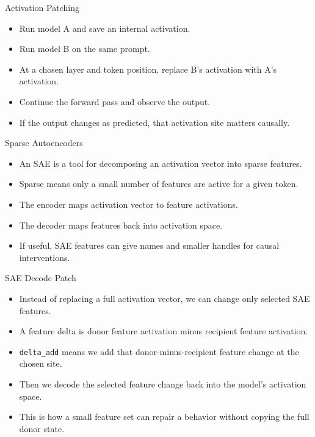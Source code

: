 \documentclass[aspectratio=169]{beamer}
\begin{document}
\begin{frame}{Activation Patching}
\small
\begin{itemize}
  \item Run model A and save an internal activation.
  \item Run model B on the same prompt.
  \item At a chosen layer and token position, replace B's activation with A's activation.
  \item Continue the forward pass and observe the output.
  \item If the output changes as predicted, that activation site matters causally.
\end{itemize}
\end{frame}

\begin{frame}{Sparse Autoencoders}
\small
\begin{itemize}
  \item An SAE is a tool for decomposing an activation vector into sparse features.
  \item Sparse means only a small number of features are active for a given token.
  \item The encoder maps activation vector to feature activations.
  \item The decoder maps features back into activation space.
  \item If useful, SAE features can give names and smaller handles for causal interventions.
\end{itemize}
\end{frame}

\begin{frame}{SAE Decode Patch}
\small
\begin{itemize}
  \item Instead of replacing a full activation vector, we can change only selected SAE features.
  \item A feature delta is donor feature activation minus recipient feature activation.
  \item \texttt{delta\_add} means we add that donor-minus-recipient feature change at the chosen site.
  \item Then we decode the selected feature change back into the model's activation space.
  \item This is how a small feature set can repair a behavior without copying the full donor state.
\end{itemize}
\end{frame}
\end{document}
